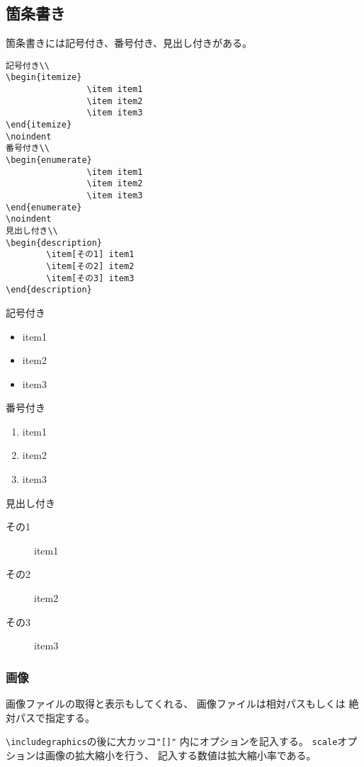 \documentclass{jsarticle}
\begin{document}
\subsection{箇条書き}
箇条書きには記号付き、番号付き、見出し付きがある。

\begin{verbatim}
記号付き\\
\begin{itemize}
				\item item1
				\item item2
				\item item3
\end{itemize}
\noindent
番号付き\\
\begin{enumerate}
				\item item1
				\item item2
				\item item3
\end{enumerate}
\noindent
見出し付き\\
\begin{description}
		\item[その1] item1
		\item[その2] item2
		\item[その3] item3
\end{description}
\end{verbatim}

{
\noindent
記号付き\\
\begin{itemize}
				\item item1
				\item item2
				\item item3
\end{itemize}
\noindent
番号付き\\
\begin{enumerate}
				\item item1
				\item item2
				\item item3
\end{enumerate}
\noindent
見出し付き\\
\begin{description}
		\item[その1] item1
		\item[その2] item2
		\item[その3] item3
\end{description}
}


\subsubsection{画像}
画像ファイルの取得と表示もしてくれる、
画像ファイルは相対パスもしくは
絶対パスで指定する。\par
\verb|\includegraphics|の後に大カッコ\verb|"[]"|
内にオプションを記入する。
\verb|scale|オプションは画像の拡大縮小を行う、
記入する数値は拡大縮小率である。
\end{document}
